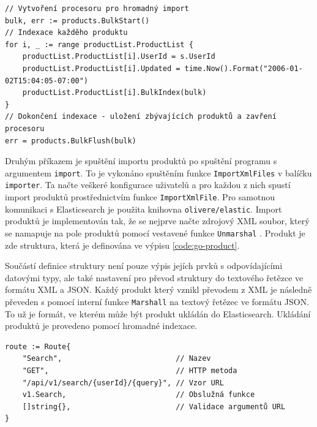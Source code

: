 \documentclass[FM,DP]{tulthesis}
\newenvironment{code}
    {\filbreak\captionsetup{type=listing}}{\filbreak}
\begin{document}
\begin{code}
\captionsetup{singlelinecheck=false,justification=raggedright}
\label{code:go-indexing}
\begin{verbatim}
// Vytvoření procesoru pro hromadný import
bulk, err := products.BulkStart()
// Indexace každěho produktu
for i, _ := range productList.ProductList {
    productList.ProductList[i].UserId = s.UserId
    productList.ProductList[i].Updated = time.Now().Format("2006-01-02T15:04:05-07:00")
    productList.ProductList[i].BulkIndex(bulk)
}
// Dokončení indexace - uložení zbývajících produktů a zavření procesoru
err = products.BulkFlush(bulk)
\end{verbatim}
\end{code}

Druhým příkazem je spuštění importu produktů po spuštění programu s argumentem \verb|import|.
To je vykonáno spuštěním funkce \verb|ImportXmlFiles| v balíčku \verb|importer|. Ta načte 
veškeré konfigurace uživatelů a pro každou z nich spustí import produktů prostřednictvím 
funkce \verb|ImportXmlFile|. Pro samotnou komunikaci s Elasticsearch je použita knihovna 
\verb|olivere/elastic|. Import produktů je implementován tak, že se nejprve načte zdrojový
XML soubor, který se namapuje na pole produktů pomocí vestavené
funkce \verb|Unmarshal| \cite{go-xml}. Produkt je zde struktura, která je definována 
ve výpisu \ref{code:go-product}.

Součástí definice struktury není pouze výpis jejích prvků s odpovídajícími datovými typy, 
ale také nastavení pro převod struktury do textového řetězce ve formátu XML a JSON.
Každý produkt který vznikl převodem z XML je následně převeden s pomocí interní funkce \verb|Marshall|
na textový řetězec ve formátu JSON. To už je formát, ve kterém může být produkt ukládán do
Elasticsearch. Ukládání produktů je provedeno pomocí hromadné indexace.

\begin{code}
\captionsetup{singlelinecheck=false,justification=raggedright}
\label{code:go-routing}
\begin{verbatim}
route := Route{
    "Search",                          // Nazev
    "GET",                             // HTTP metoda
    "/api/v1/search/{userId}/{query}", // Vzor URL
    v1.Search,                         // Obslužná funkce
    []string{},                        // Validace argumentů URL
}
\end{verbatim}
\end{code}
\end{document}
